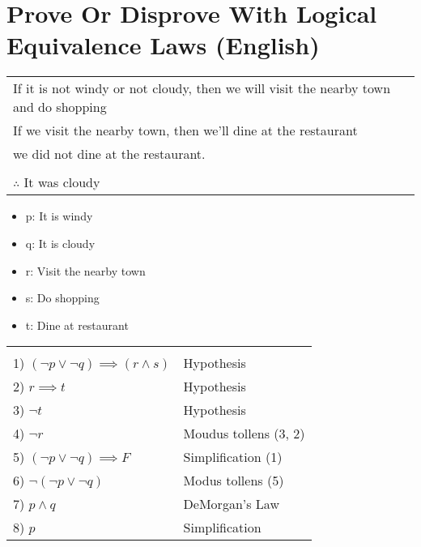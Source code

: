 \documentclass[a4paper]{article}
\begin{document}
\bigskip %

\section{Prove Or Disprove With Logical Equivalence Laws (English)}
\begin{center}
\begin{tabularx}{0.8\textwidth}{|X|}
\hline
If it is not windy or not cloudy, then we will visit the nearby town and do shopping \\
If we visit the nearby town, then we'll dine at the restaurant \\
we did not dine at the restaurant. \\ [1ex]

\toprule \\

$\therefore$ It was cloudy \\
\hline
\end{tabularx}
\end{center}

\begin{itemize}
    \item p: It is windy 
    \item q: It is cloudy 
    \item r: Visit the nearby town 
    \item s: Do shopping 
    \item t: Dine at restaurant 
\end{itemize}

\begin{tabularx}{0.6\textwidth}{X X}
\toprule \\
1) $(\neg p \lor \neg q) \implies (r \land s)$ & Hypothesis \\
2) $r \implies t$ & Hypothesis \\
3) $\neg t$ & Hypothesis \\
4) $\neg r$ & Moudus tollens (3, 2) \\
5) $(\neg p \lor \neg q) \implies F$ & Simplification (1) \\
6) $\neg (\neg p \lor \neg q)$ & Modus tollens (5) \\
7) $p \land q$ & DeMorgan's Law \\
8) $p$ & Simplification 
\end{tabularx}

\bigskip %
\end{document}
